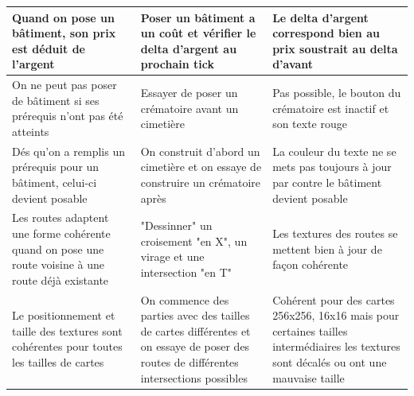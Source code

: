 \documentclass[a4paper,10pt,openany,oneside]{report}
\begin{document}
\begin{center}
\begin{tabular}{| p{3cm} | p{6cm} | p{6cm} |}
		\\ \hline Quand on pose un bâtiment, son prix est déduit de l'argent & Poser un bâtiment a un coût et vérifier le delta d'argent au prochain tick & Le delta d'argent correspond bien au prix soustrait au delta d'avant
		\\ \hline On ne peut pas poser de bâtiment si ses prérequis n'ont pas été atteints & Essayer de poser un crématoire avant un cimetière & Pas possible, le bouton du crématoire est inactif et son texte rouge
		\\ \hline Dés qu'on a remplis un prérequis pour un bâtiment, celui-ci devient posable & On construit d'abord un cimetière et on essaye de construire un crématoire après & La couleur du texte ne se mets pas toujours à jour par contre le bâtiment devient posable
		\\ \hline Les routes adaptent une forme cohérente quand on pose une route voisine à une route déjà existante & "Dessinner" un croisement "en X", un virage et une intersection "en T" & Les textures des routes se mettent bien à jour de façon cohérente
		\\ \hline Le positionnement et taille des textures sont cohérentes pour toutes les tailles de cartes & On commence des parties avec des tailles de cartes différentes et on essaye de poser des routes de différentes intersections possibles & Cohérent pour des cartes 256x256, 16x16 mais pour certaines tailles intermédiaires les textures sont décalés ou ont une mauvaise taille
	
	\end{tabular}
\end{center}
\end{document}
